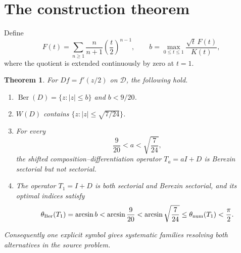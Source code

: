 \documentclass[11pt]{amsart}
\newtheorem{theorem}{Theorem}
\theoremstyle{definition}
\newcommand{\Dsp}{\mathcal D}
\newcommand{\Ber}{\operatorname{Ber}}
\newcommand{\Num}{W}
\begin{document}
\section{The construction theorem}

Define
\[
 F(t)=\sum_{n\ge1}\frac{n}{n+1}\left(\frac t2\right)^{n-1},
 \qquad
 b=\max_{0\le t\le1}\frac{\sqrt t\,F(t)}{K(t)},
\]
where the quotient is extended continuously by zero at \(t=1\).

\begin{theorem}\label{thm:main}
For \(D f=f'(z/2)\) on \(\Dsp\), the following hold.
\begin{enumerate}
\item \(\Ber(D)=\{z:|z|\le b\}\) and \(b<9/20\).
\item \(\Num(D)\) contains \(\{z:|z|\le\sqrt{7/24}\}\).
\item For every
\[
 \frac9{20}<a<\sqrt{\frac7{24}},
\]
the shifted composition--differentiation operator \(T_a=aI+D\) is Berezin
sectorial but not sectorial.
\item The operator \(T_1=I+D\) is both sectorial and Berezin sectorial, and
its optimal indices satisfy
\[
 \theta_{\rm Ber}(T_1)=\arcsin b
 <\arcsin\frac9{20}
 <\arcsin\sqrt{\frac7{24}}
 \le \theta_{\rm num}(T_1)<\frac\pi2.
\]
\end{enumerate}
Consequently one explicit symbol gives systematic families resolving both
alternatives in the source problem.
\end{theorem}
\end{document}
